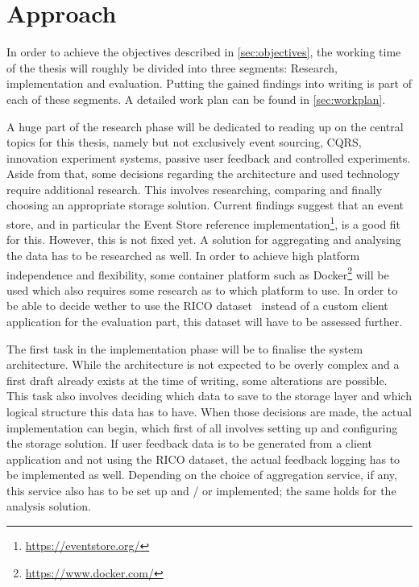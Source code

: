 %
\chapter{Approach}
\label{sec:approach}

In order to achieve the objectives described in \cref{sec:objectives}, the working time of the thesis will roughly be divided into three segments: Research, implementation and evaluation.
Putting the gained findings into writing is part of each of these segments.
A detailed work plan can be found in \cref{sec:workplan}.

A huge part of the research phase will be dedicated to reading up on the central topics for this thesis, namely but not exclusively event sourcing, \ac{CQRS}, innovation experiment systems, passive user feedback and controlled experiments.
Aside from that, some decisions regarding the architecture and used technology require additional research.
This involves researching, comparing and finally choosing an appropriate storage solution.
Current findings suggest that an event store, and in particular the Event Store reference implementation\footnote{\url{https://eventstore.org/}}, is a good fit for this.
However, this is not fixed yet.
A solution for aggregating and analysing the data has to be researched as well.
In order to achieve high platform independence and flexibility, some container platform such as Docker\footnote{\url{https://www.docker.com/}} will be used which also requires some research as to which platform to use.
In order to be able to decide wether to use the RICO dataset~\cite{Deka:2017:Rico} instead of a custom client application for the evaluation part, this dataset will have to be assessed further.

The first task in the implementation phase will be to finalise the system architecture.
While the architecture is not expected to be overly complex and a first draft already exists at the time of writing, some alterations are possible.
This task also involves deciding which data to save to the storage layer and which logical structure this data has to have.
When those decisions are made, the actual implementation can begin, which first of all involves setting up and configuring the storage solution.
If user feedback data is to be generated from a client application and not using the RICO dataset, the actual feedback logging has to be implemented as well.
Depending on the choice of aggregation service, if any, this service also has to be set up and / or implemented; the same holds for the analysis solution.

